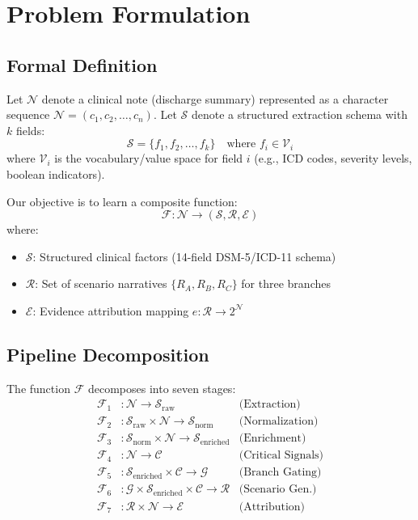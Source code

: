 \documentclass[conference]{IEEEtran}
\begin{document}
\section{Problem Formulation}

\subsection{Formal Definition}

Let $\mathcal{N}$ denote a clinical note (discharge summary) represented as a character sequence $\mathcal{N} = (c_1, c_2, \ldots, c_n)$. Let $\mathcal{S}$ denote a structured extraction schema with $k$ fields:
\begin{equation}
    \mathcal{S} = \{f_1, f_2, \ldots, f_k\} \quad \text{where } f_i \in \mathcal{V}_i
\end{equation}
where $\mathcal{V}_i$ is the vocabulary/value space for field $i$ (e.g., ICD codes, severity levels, boolean indicators).

Our objective is to learn a composite function:
\begin{equation}
    \mathcal{F}: \mathcal{N} \rightarrow (\mathcal{S}, \mathcal{R}, \mathcal{E})
\end{equation}
where:
\begin{itemize}
    \item $\mathcal{S}$: Structured clinical factors (14-field DSM-5/ICD-11 schema)
    \item $\mathcal{R}$: Set of scenario narratives $\{R_A, R_B, R_C\}$ for three branches
    \item $\mathcal{E}$: Evidence attribution mapping $e: \mathcal{R} \rightarrow 2^{\mathcal{N}}$
\end{itemize}

\subsection{Pipeline Decomposition}

The function $\mathcal{F}$ decomposes into seven stages:
\begin{align}
    \mathcal{F}_1&: \mathcal{N} \rightarrow \mathcal{S}_{\text{raw}} & \text{(Extraction)} \\
    \mathcal{F}_2&: \mathcal{S}_{\text{raw}} \times \mathcal{N} \rightarrow \mathcal{S}_{\text{norm}} & \text{(Normalization)} \\
    \mathcal{F}_3&: \mathcal{S}_{\text{norm}} \times \mathcal{N} \rightarrow \mathcal{S}_{\text{enriched}} & \text{(Enrichment)} \\
    \mathcal{F}_4&: \mathcal{N} \rightarrow \mathcal{C} & \text{(Critical Signals)} \\
    \mathcal{F}_5&: \mathcal{S}_{\text{enriched}} \times \mathcal{C} \rightarrow \mathcal{G} & \text{(Branch Gating)} \\
    \mathcal{F}_6&: \mathcal{G} \times \mathcal{S}_{\text{enriched}} \times \mathcal{C} \rightarrow \mathcal{R} & \text{(Scenario Gen.)} \\
    \mathcal{F}_7&: \mathcal{R} \times \mathcal{N} \rightarrow \mathcal{E} & \text{(Attribution)}
\end{align}
\end{document}
